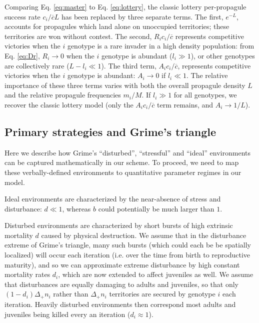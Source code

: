 \documentclass[11pt]{article}
\begin{document}
Comparing Eq. \eqref{eq:master} to Eq. \eqref{eq:lottery}, the classic lottery per-propagule success rate $c_i/\overline{c}L$ has been replaced by three separate terms. The first, $e^{-L}$, accounts for propagules which land alone on unoccupied territories; these territories are won without contest. The second, $R_i c_i/\overline{c}$ represents competitive victories when the $i$ genotype is a rare invader in a high density population: from Eq. \eqref{eq:Dr}, $R_i\rightarrow 0$ when the $i$ genotype is abundant ($l_i\gg 1$), or other genotypes are collectively rare ($L-l_i\ll 1$). The third term, $A_ic_i/\overline{c}$, represents competitive victories when the $i$ genotype is abundant: $A_i\rightarrow 0$ if $l_i\ll 1$. The relative importance of these three terms varies with both the overall propagule density $L$ and the relative propagule frequencies $m_i/M$. If $l_i\gg 1$ for all genotypes, we recover the classic lottery model (only the $A_ic_i/\overline{c}$ term remains, and $A_i\rightarrow 1/L$). 

\subsection*{Primary strategies and Grime's triangle}

Here we describe how Grime's ``disturbed'', ``stressful'' and ``ideal'' environments can be captured mathematically in our scheme. To proceed, we need to map these verbally-defined environments to quantitative parameter regimes in our model. 

Ideal environments are characterized by the near-absence of stress and disturbance: $d\ll 1$, whereas $b$ could potentially be much larger than $1$. 

Disturbed environments are characterized by short bursts of high extrinsic mortality $d$ caused by physical destruction. We assume that in the disturbance extreme of Grime's triangle, many such bursts (which could each be be spatially localized) will occur each iteration (i.e. over the time from birth to reproductive maturity), and so we can approximate extreme disturbance by high constant mortality rates $d_i$, which are now extended to affect juveniles as well. We assume that disturbances are equally damaging to adults and juveniles, so that only $(1-d_i)\Delta_+ n_i$ rather than $\Delta_+ n_i$ territories are secured by genotype $i$ each iteration. Heavily disturbed environments then correspond most adults and juveniles being killed every an iteration ($d_i\approx 1$). 
\end{document}
